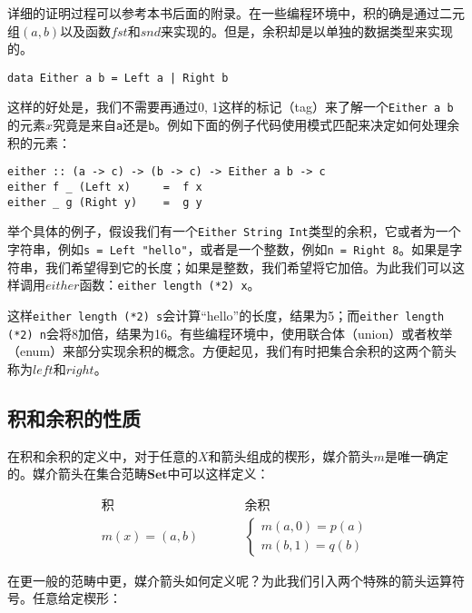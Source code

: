 \documentclass{article}
\begin{document}
详细的证明过程可以参考本书后面的附录。在一些编程环境中，积的确是通过二元组$(a, b)$以及函数$fst$和$snd$来实现的。但是，余积却是以单独的数据类型来实现的。

\lstset{frame = single}
\begin{lstlisting}
data Either a b = Left a | Right b
\end{lstlisting}

这样的好处是，我们不需要再通过0, 1这样的标记（tag）来了解一个\texttt{Either a b}的元素$x$究竟是来自\texttt{a}还是\texttt{b}。例如下面的例子代码使用模式匹配来决定如何处理余积的元素：

\begin{lstlisting}
either :: (a -> c) -> (b -> c) -> Either a b -> c
either f _ (Left x)     =  f x
either _ g (Right y)    =  g y
\end{lstlisting}
\lstset{frame = none}

举个具体的例子，假设我们有一个\texttt{Either String Int}类型的余积，它或者为一个字符串，例如\texttt{s = Left "hello"}，或者是一个整数，例如\texttt{n = Right 8}。如果是字符串，我们希望得到它的长度；如果是整数，我们希望将它加倍。为此我们可以这样调用$either$函数：\texttt{either length (*2) x}。

这样\texttt{either length (*2) s}会计算“hello”的长度，结果为5；而\texttt{either length (*2) n}会将8加倍，结果为16。有些编程环境中，使用联合体（union）或者枚举（enum）来部分实现余积的概念。方便起见，我们有时把集合余积的这两个箭头称为$left$和$right$。

\subsection{积和余积的性质}

在积和余积的定义中，对于任意的$X$和箭头组成的楔形，媒介箭头$m$是唯一确定的。媒介箭头在集合范畴$\pmb{Set}$中可以这样定义：

\[
\begin{array}{ccc}
\text{积} & & \text{余积} \\
m(x) = (a, b) & \quad \quad &
\begin{cases}
m (a, 0) = p(a) \\
m (b, 1) = q(b)
\end{cases}
\end{array}
\]

在更一般的范畴中更，媒介箭头如何定义呢？为此我们引入两个特殊的箭头运算符号。任意给定楔形：

\begin{center}
\end{center}
\end{document}
